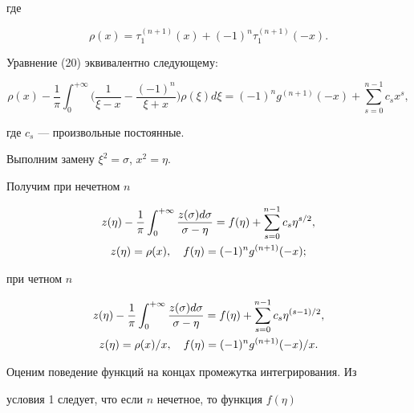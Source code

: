 где


\begin{equation}


\rho(x)=\tau_1^{(n+1)}(x)+(-1)^n\tau_1^{(n+1)}(-x).


\end{equation}


Уравнение (20) эквивалентно следующему:


$$


\rho(x) - \frac{1}{\pi}\int^{+\infty}_0


\biggl(\frac{1}{\xi-x}-\frac{(-1)^n}{\xi+x}\biggr)\rho(\xi)


d\xi= (-1)^ng^{(n+1)}(-x) + \sum \limits_{s=0}^{n-1} c_sx^s,


$$


где $ c_s$ --- произвольные постоянные.





Выполним замену $\xi^2=\sigma$, $x^2=\eta$.


Получим при нечетном $n$


\begin{gather}


z(\eta)- \frac{1}{\pi}\int^{+\infty}_0\frac{z(\sigma )d\sigma}


{\sigma -\eta}=f(\eta)+\sum \limits_{s=0}^{n-1}c_s\eta^{s/2}, \\


%


z(\eta)=\rho(x), \quad f(\eta)=(-1)^ng^{(n+1)}(-x);\notag


\end{gather}


при четном $n$


\begin{gather}


z(\eta)- \frac{1}{\pi}\int^{+\infty}_0\frac{z(\sigma )d\sigma}


{\sigma -\eta}=f(\eta)+\sum \limits_{s=0}^{n-1}c_s\eta^{(s-1)/2}, \\


%


z(\eta)=\rho(x)/x, \quad f(\eta)=(-1)^ng^{(n+1)}(-x)/x.\notag


\end{gather}





Оценим поведение функций на концах промежутка интегрирования. Из


условия 1 следует, что если $n$ нечетное, то функция $f(\eta)$


